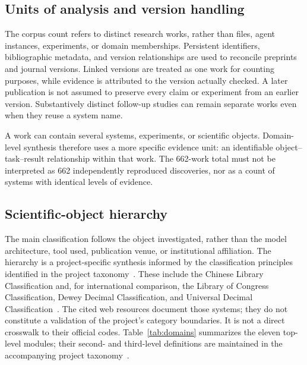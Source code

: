 \subsection{Units of analysis and version handling}

The corpus count refers to distinct research works, rather than files, agent instances, experiments, or domain memberships. Persistent identifiers, bibliographic metadata, and version relationships are used to reconcile preprints and journal versions. Linked versions are treated as one work for counting purposes, while evidence is attributed to the version actually checked. A later publication is not assumed to preserve every claim or experiment from an earlier version. Substantively distinct follow-up studies can remain separate works even when they reuse a system name.

A work can contain several systems, experiments, or scientific objects. Domain-level synthesis therefore uses a more specific evidence unit: an identifiable object--task--result relationship within that work. The 662-work total must not be interpreted as 662 independently reproduced discoveries, nor as a count of systems with identical levels of evidence.

\subsection{Scientific-object hierarchy}

The main classification follows the object investigated, rather than the model architecture, tool used, publication venue, or institutional affiliation. The hierarchy is a project-specific synthesis informed by the classification principles identified in the project taxonomy~\cite{projecttaxonomy,projectpolicy,projectboundaries}. These include the Chinese Library Classification and, for international comparison, the Library of Congress Classification, Dewey Decimal Classification, and Universal Decimal Classification~\cite{lcc,ddc,udc}. The cited web resources document those systems; they do not constitute a validation of the project's category boundaries. It is not a direct crosswalk to their official codes. Table~\ref{tab:domains} summarizes the eleven top-level modules; their second- and third-level definitions are maintained in the accompanying project taxonomy~\cite{projecttaxonomy,projectpolicy,projectboundaries}.

